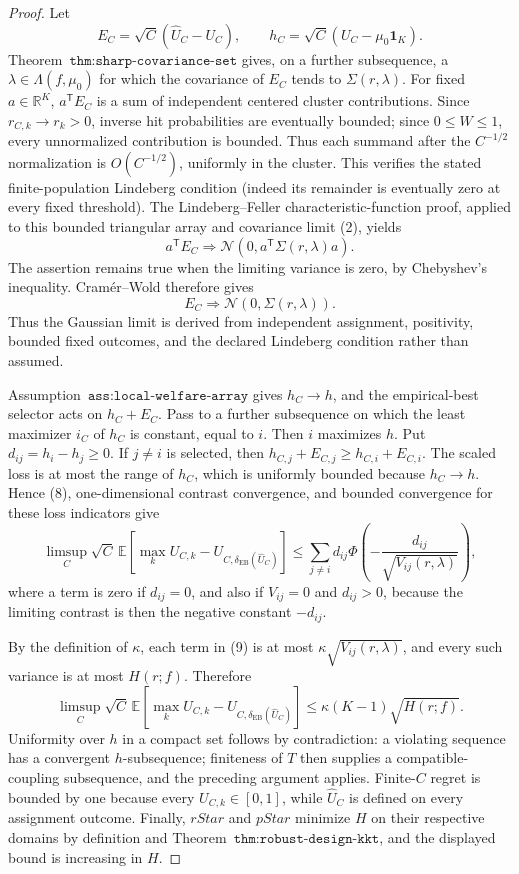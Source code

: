 \documentclass{article}
\begin{document}
\begin{proof}
Let
\[
E_C=\sqrt C(\widehat U_C-U_C),\qquad h_C=\sqrt C(U_C-\mu_0\mathbf1_K).
\]
Theorem~\(\texttt{thm:sharp-covariance-set}\) gives, on a further subsequence, a \(\lambda\in\Lambda(f,\mu_0)\) for which the covariance of \(E_C\) tends to \(\Sigma(r,\lambda)\). For fixed \(a\in\mathbb R^K\), \(a^{\mathsf T}E_C\) is a sum of independent centered cluster contributions. Since \(r_{C,k}\to r_k>0\), inverse hit probabilities are eventually bounded; since \(0\le W\le1\), every unnormalized contribution is bounded. Thus each summand after the \(C^{-1/2}\) normalization is \(O(C^{-1/2})\), uniformly in the cluster. This verifies the stated finite-population Lindeberg condition (indeed its remainder is eventually zero at every fixed threshold). The Lindeberg--Feller characteristic-function proof, applied to this bounded triangular array and covariance limit (2), yields
\[
a^{\mathsf T}E_C\Rightarrow\mathcal N(0,a^{\mathsf T}\Sigma(r,\lambda)a).
\]
The assertion remains true when the limiting variance is zero, by Chebyshev's inequality. Cram\'er--Wold therefore gives
\[
E_C\Rightarrow\mathcal N(0,\Sigma(r,\lambda)).
\tag{8}
\]
Thus the Gaussian limit is derived from independent assignment, positivity, bounded fixed outcomes, and the declared Lindeberg condition rather than assumed.

Assumption~\(\texttt{ass:local-welfare-array}\) gives \(h_C\to h\), and the empirical-best selector acts on \(h_C+E_C\). Pass to a further subsequence on which the least maximizer \(i_C\) of \(h_C\) is constant, equal to \(i\). Then \(i\) maximizes \(h\). Put \(d_{ij}=h_i-h_j\ge0\). If \(j\ne i\) is selected, then \(h_{C,j}+E_{C,j}\ge h_{C,i}+E_{C,i}\). The scaled loss is at most the range of \(h_C\), which is uniformly bounded because \(h_C\to h\). Hence (8), one-dimensional contrast convergence, and bounded convergence for these loss indicators give
\[
\limsup_C\sqrt C\,\mathbb E\left[\max_kU_{C,k}-U_{C,\delta_{\mathrm{EB}}(\widehat U_C)}\right]
\le\sum_{j\ne i}d_{ij}\Phi\left(-\frac{d_{ij}}{\sqrt{V_{ij}(r,\lambda)}}\right),
\tag{9}
\]
where a term is zero if \(d_{ij}=0\), and also if \(V_{ij}=0\) and \(d_{ij}>0\), because the limiting contrast is then the negative constant \(-d_{ij}\).

By the definition of \(\kappa\), each term in (9) is at most \(\kappa\sqrt{V_{ij}(r,\lambda)}\), and every such variance is at most \(H(r;f)\). Therefore
\[
\limsup_C\sqrt C\,\mathbb E\left[\max_kU_{C,k}-U_{C,\delta_{\mathrm{EB}}(\widehat U_C)}\right]
\le\kappa(K-1)\sqrt{H(r;f)}.
\]
Uniformity over \(h\) in a compact set follows by contradiction: a violating sequence has a convergent \(h\)-subsequence; finiteness of \(T\) then supplies a compatible-coupling subsequence, and the preceding argument applies. Finite-\(C\) regret is bounded by one because every \(U_{C,k}\in[0,1]\), while \(\widehat U_C\) is defined on every assignment outcome. Finally, \(rStar\) and \(pStar\) minimize \(H\) on their respective domains by definition and Theorem~\(\texttt{thm:robust-design-kkt}\), and the displayed bound is increasing in \(H\).
\end{proof}
\end{document}
